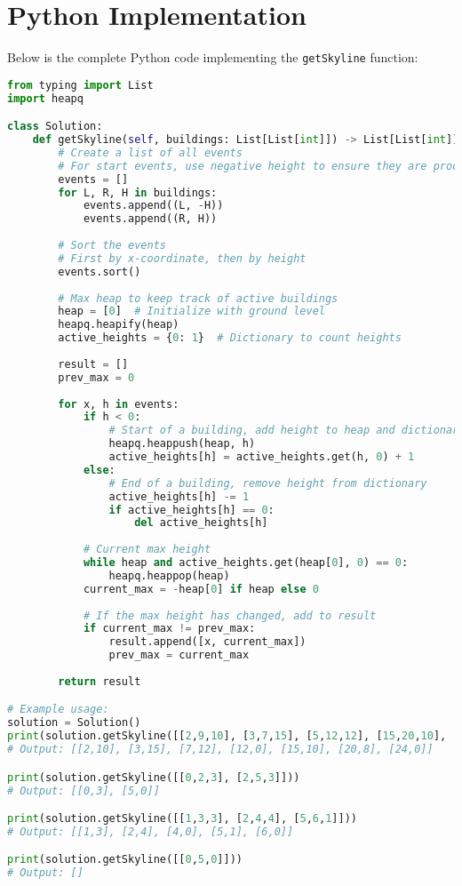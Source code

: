 \section*{Python Implementation}


Below is the complete Python code implementing the \texttt{getSkyline} function:

\begin{fullwidth}
\begin{lstlisting}[language=Python]
from typing import List
import heapq

class Solution:
    def getSkyline(self, buildings: List[List[int]]) -> List[List[int]]:
        # Create a list of all events
        # For start events, use negative height to ensure they are processed before end events
        events = []
        for L, R, H in buildings:
            events.append((L, -H))
            events.append((R, H))
        
        # Sort the events
        # First by x-coordinate, then by height
        events.sort()
        
        # Max heap to keep track of active buildings
        heap = [0]  # Initialize with ground level
        heapq.heapify(heap)
        active_heights = {0: 1}  # Dictionary to count heights
        
        result = []
        prev_max = 0
        
        for x, h in events:
            if h < 0:
                # Start of a building, add height to heap and dictionary
                heapq.heappush(heap, h)
                active_heights[h] = active_heights.get(h, 0) + 1
            else:
                # End of a building, remove height from dictionary
                active_heights[h] -= 1
                if active_heights[h] == 0:
                    del active_heights[h]
            
            # Current max height
            while heap and active_heights.get(heap[0], 0) == 0:
                heapq.heappop(heap)
            current_max = -heap[0] if heap else 0
            
            # If the max height has changed, add to result
            if current_max != prev_max:
                result.append([x, current_max])
                prev_max = current_max
        
        return result

# Example usage:
solution = Solution()
print(solution.getSkyline([[2,9,10], [3,7,15], [5,12,12], [15,20,10], [19,24,8]]))
# Output: [[2,10], [3,15], [7,12], [12,0], [15,10], [20,8], [24,0]]

print(solution.getSkyline([[0,2,3], [2,5,3]]))
# Output: [[0,3], [5,0]]

print(solution.getSkyline([[1,3,3], [2,4,4], [5,6,1]]))
# Output: [[1,3], [2,4], [4,0], [5,1], [6,0]]

print(solution.getSkyline([[0,5,0]]))
# Output: []
\end{lstlisting}
\end{fullwidth}

